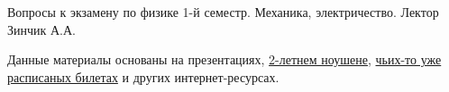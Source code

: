 Вопросы к экзамену по физике 1-й семестр. Механика, электричество. Лектор Зинчик А.А. 

Данные материалы основаны на презентациях, 
\href{https://www.notion.so/native/ea1ac09f314447ba9ff3c53c9288204c?ysclid=lr9ui9gdbb832178919&deepLinkOpenNewTab=true}{2-летнем ноушене}, 
\href{https://studfile.net/preview/17179894/}{чьих-то уже расписаных билетах} и других интернет-ресурсах.